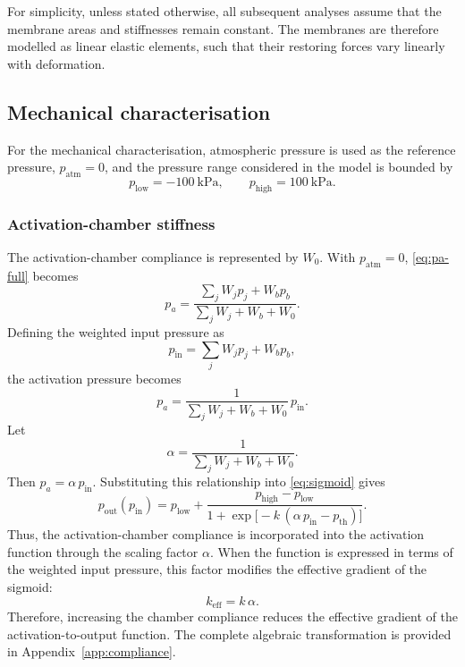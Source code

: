 \documentclass[11pt,a4paper]{article}
\numberwithin{equation}{section}
\newcommand{\pin}{p_{\mathrm{in}}}
\newcommand{\pout}{p_{\mathrm{out}}}
\newcommand{\patm}{p_{\mathrm{atm}}}
\newcommand{\plow}{p_{\mathrm{low}}}
\newcommand{\phigh}{p_{\mathrm{high}}}
\newcommand{\pth}{p_{\mathrm{th}}}
\begin{document}
For simplicity, unless stated otherwise, all subsequent analyses assume that the membrane areas and stiffnesses
remain constant. The membranes are therefore modelled as linear elastic elements, such that their restoring forces
vary linearly with deformation.

\subsection{Mechanical characterisation}

For the mechanical characterisation, atmospheric pressure is used as the reference pressure, $\patm = 0$, and the
pressure range considered in the model is bounded by
\begin{equation*}
  \plow = -100~\mathrm{kPa}, \qquad \phigh = 100~\mathrm{kPa}.
\end{equation*}

\subsubsection{Activation-chamber stiffness}

The activation-chamber compliance is represented by $W_0$. With $\patm = 0$, \cref{eq:pa-full} becomes
\begin{equation}
  p_a = \frac{\sum_j W_j p_j + W_b p_b}{\sum_j W_j + W_b + W_0} .
  \label{eq:pa-atm0}
\end{equation}
Defining the weighted input pressure as
\begin{equation}
  \pin = \sum_j W_j p_j + W_b p_b,
  \label{eq:pin}
\end{equation}
the activation pressure becomes
\begin{equation}
  p_a = \frac{1}{\sum_j W_j + W_b + W_0}\,\pin .
  \label{eq:pa-pin}
\end{equation}
Let
\begin{equation}
  \alpha = \frac{1}{\sum_j W_j + W_b + W_0} .
  \label{eq:alpha}
\end{equation}
Then $p_a = \alpha\,\pin$. Substituting this relationship into \cref{eq:sigmoid} gives
\begin{equation}
  \pout(\pin) = \plow + \frac{\phigh - \plow}{1 + \exp\bigl[-k\,(\alpha\,\pin - \pth)\bigr]} .
  \label{eq:sigmoid-pin}
\end{equation}
Thus, the activation-chamber compliance is incorporated into the activation function through the scaling factor
$\alpha$. When the function is expressed in terms of the weighted input pressure, this factor modifies the
effective gradient of the sigmoid:
\begin{equation}
  k_{\mathrm{eff}} = k\,\alpha .
  \label{eq:keff}
\end{equation}
Therefore, increasing the chamber compliance reduces the effective gradient of the activation-to-output function.
The complete algebraic transformation is provided in Appendix~\ref{app:compliance}.
\end{document}
